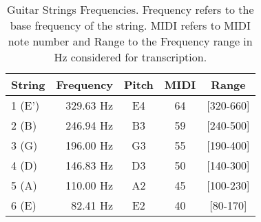 \begin{table}[ht!]
\centering
  \caption[Guitar Strings Frequencies.]{Guitar Strings Frequencies. Frequency refers to the base frequency of the string. MIDI refers to MIDI note number and Range to the Frequency range in Hz considered for transcription.}
  \label{tab:guitar_strings}
  \begin{tabular}{  l r c c c }
    \hline
	String & Frequency & Pitch & MIDI & Range\\ \hline
    1 (E') & 329.63 Hz & E4 & 64 & [320-660]\\ 
    2 (B) & 246.94 Hz & B3 & 59 & [240-500]\\
    3 (G) & 196.00 Hz & G3 & 55 & [190-400]\\
    4 (D) & 146.83 Hz & D3 & 50 & [140-300]\\
    5 (A) & 110.00 Hz & A2 & 45 & [100-230]\\
    6 (E) & 82.41 Hz & E2 & 40 & [80-170]\\
    \hline
  \end{tabular}

\end{table}
